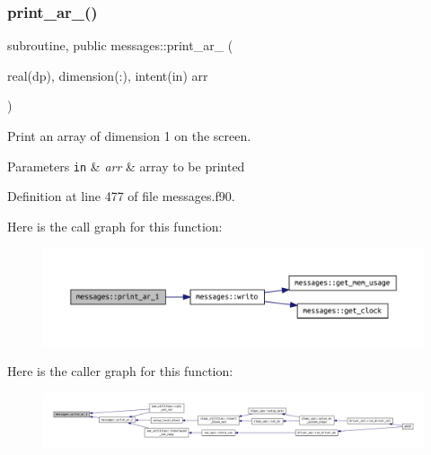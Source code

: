 \subsubsection{\texorpdfstring{print\+\_\+ar\+\_()}{print\_ar\_1()}}
{\footnotesize\ttfamily subroutine, public messages\+::print\+\_\+ar\+\_ (\begin{DoxyParamCaption}\item[{real(dp), dimension(\+:), intent(in)}]{arr }\end{DoxyParamCaption})}



Print an array of dimension 1 on the screen. 


\begin{DoxyParams}[1]{Parameters}
\mbox{\tt in}  & {\em arr} & array to be printed \\
\hline
\end{DoxyParams}


Definition at line 477 of file messages.\+f90.

Here is the call graph for this function\+:\nopagebreak
\begin{figure}[H]
\begin{center}
\leavevmode
\includegraphics[width=350pt]{namespacemessages_a5686118397930f505259225f3688216b_cgraph}
\end{center}
\end{figure}
Here is the caller graph for this function\+:\nopagebreak
\begin{figure}[H]
\begin{center}
\leavevmode
\includegraphics[width=350pt]{namespacemessages_a5686118397930f505259225f3688216b_icgraph}
\end{center}
\end{figure}
\mbox{\label{namespacemessages_a80797cedef6112b8dccaeda431f0c610}} 
